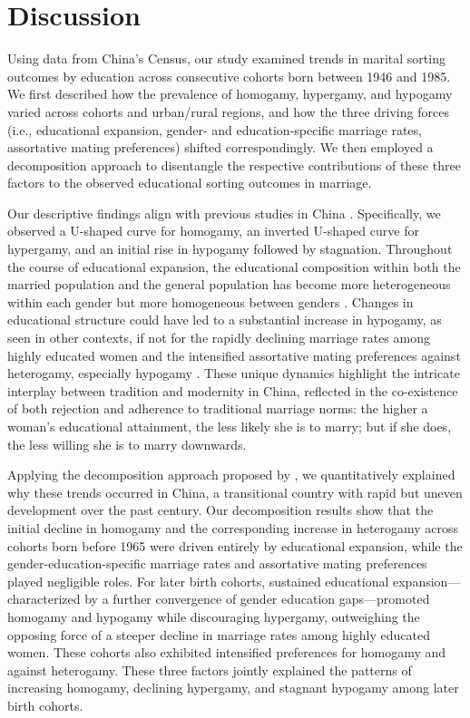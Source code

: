 \section{Discussion}
\label{sec:ch4-discussion}

Using data from China's Census, our study examined trends in marital sorting outcomes by education across consecutive cohorts born between 1946 and 1985. We first described how the prevalence of homogamy, hypergamy, and hypogamy varied across cohorts and urban/rural regions, and how the three driving forces (i.e., educational expansion, gender- and education-specific marriage rates, assortative mating preferences) shifted correspondingly. We then employed a decomposition approach to disentangle the respective contributions of these three factors to the observed educational sorting outcomes in marriage.

Our descriptive findings align with previous studies in China \parencite{dongTrendsEducationalAssortative2023,hanTrendsEducationalAssortative2010,shiSevenDecadesEducational2019}. Specifically, we observed a U-shaped curve for homogamy, an inverted U-shaped curve for hypergamy, and an initial rise in hypogamy followed by stagnation. Throughout the course of educational expansion, the educational composition within both the married population and the general population has become more heterogeneous within each gender but more homogeneous between genders \parencite{yeungHigherEducationExpansion2013}. Changes in educational structure could have led to a substantial increase in hypogamy, as seen in other contexts, if not for the rapidly declining marriage rates among highly educated women and the intensified assortative mating preferences against heterogamy, especially hypogamy \parencite{hanTrendsEducationalAssortative2010,huGenderEducationExpansion2023}. These unique dynamics highlight the intricate interplay between tradition and modernity in China, reflected in the co-existence of both rejection and adherence to traditional marriage norms: the higher a woman's educational attainment, the less likely she is to marry; but if she does, the less willing she is to marry downwards.

Applying the decomposition approach proposed by \textcite{leeschDecomposingTrendsEducational2023}, we quantitatively explained why these trends occurred in China, a transitional country with rapid but uneven development over the past century. Our decomposition results show that the initial decline in homogamy and the corresponding increase in heterogamy across cohorts born before 1965 were driven entirely by educational expansion, while the gender-education-specific marriage rates and assortative mating preferences played negligible roles. For later birth cohorts, sustained educational expansion—characterized by a further convergence of gender education gaps—promoted homogamy and hypogamy while discouraging hypergamy, outweighing the opposing force of a steeper decline in marriage rates among highly educated women. These cohorts also exhibited intensified preferences for homogamy and against heterogamy. These three factors jointly explained the patterns of increasing homogamy, declining hypergamy, and stagnant hypogamy among later birth cohorts.

